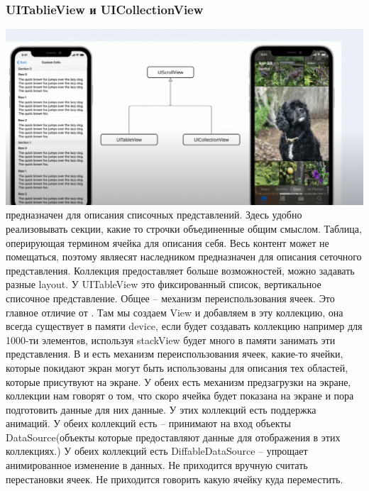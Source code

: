 \documentclass{article}
\begin{document}
    \subsubsection{UITablieView и UICollectionView}
    \includegraphics[scale = 0.3]{pic/Снимок экрана 2023-08-01 в 01.37.09.png}
    \newline
     предназначен для описания списочных представлений. Здесь удобно реализовывать секции, какие то строчки объединенные общим смыслом. Таблица, оперирующая термином ячейка для описания себя. Весь контент может не помещаться, поэтому являесят наследником 
    \newline
     предназначен для описания сеточного представления. Коллекция предоставляет больше возможностей, можно задавать разные layout. У UITableView это фиксированный список, вертикальное списочное представление. 
    \newline
    Общее -- механизм переиспользования ячеек. Это главное отличие от . Там мы создаем View и добавляем в эту коллекцию, она всегда существует в памяти device, если будет создавать коллекцию например для 1000-ти элементов, используя stackView будет много в памяти занимать эти представления. 
    \newline
    В  и  есть механизм переиспользования ячеек, какие-то ячейки, которые покидают экран могут быть использованы для описания тех областей, которые присутвуют на экране. У обеих есть механизм предзагрузки на экране, коллекции нам говорят о том, что скоро ячейка будет показана на экране и пора подготовить данные для них данные. У этих коллекций есть поддержка анимаций. 
    \newline
    У обеих коллекций есть  -- принимают на вход объекты DataSource(объекты которые предоставляют данные для отображения в этих коллекциях.) У обеих коллекций есть DiffableDataSource -- упрощает анимированное изменение в данных. Не приходится вручную считать перестановки ячеек. Не приходится говорить какую ячейку куда переместить. 
\end{document}
